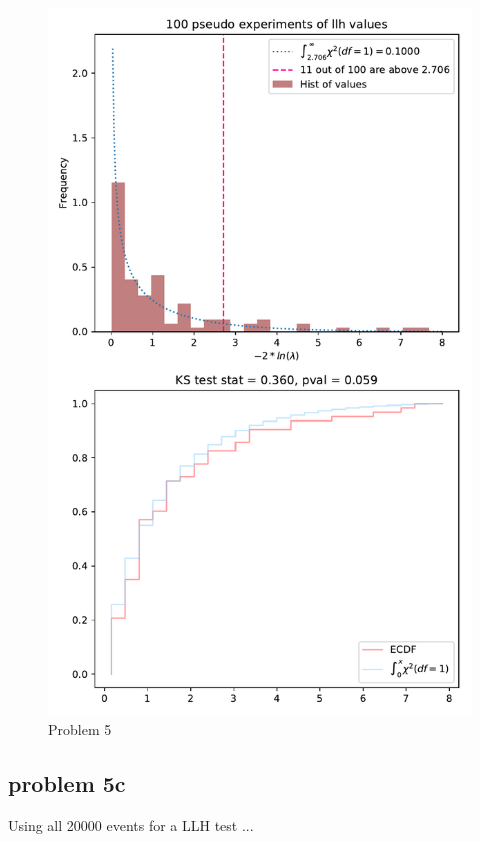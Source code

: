 \documentclass[a4paper,11pt]{article}
\begin{document}
\begin{figure}[H]
  \includegraphics[width=\linewidth]{../p5_llhratios}
  \caption{Problem 5}
  \label{p5_llhratios}
\end{figure}

\subsection{problem 5c }
Using all 20000 events for a LLH test ...
\end{document}
